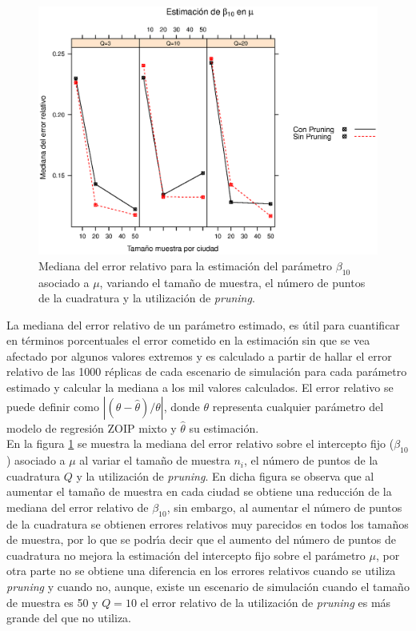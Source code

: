 \begin{figure}
	\begin{center}
		\includegraphics[scale=0.6]{MAPE_beta0_mu.eps}	
		\caption{Mediana del error relativo para la estimaci\'{o}n del par\'{a}metro $\beta_{10}$ asociado a $\mu$, variando el tama\~{n}o de muestra, el n\'{u}mero de puntos de la cuadratura y  la utilizaci\'{o}n de \textit{pruning}.}
		\label{MAPE_bo_mu}
	\end{center}
\end{figure}

La mediana del error relativo de un par\'{a}metro estimado, es \'{u}til para cuantificar en t\'{e}rminos porcentuales el error cometido en la estimaci\'{o}n sin que se vea afectado por algunos valores extremos y es calculado a partir de hallar el error relativo de las 1000 r\'{e}plicas de cada escenario de simulaci\'{o}n para cada par\'{a}metro estimado y calcular la mediana a los mil valores calculados. El error relativo se puede definir como $|(\theta-\hat{\theta})/\theta|$, donde $\theta$ representa cualquier par\'{a}metro del modelo de regresi\'{o}n ZOIP mixto y $\hat{\theta}$ su estimaci\'{o}n.\\

En la figura \ref{MAPE_bo_mu} se muestra la mediana del error relativo sobre el intercepto fijo ($\beta_{10}$) asociado a $\mu$ al variar el tama\~{n}o de muestra $n_i$, el n\'{u}mero de puntos de la cuadratura $Q$ y la utilizaci\'{o}n de \textit{pruning}. En dicha figura se observa que al aumentar el tama\~{n}o de muestra en cada ciudad se obtiene una reducci\'{o}n de la mediana del error relativo de $\beta_{10}$, sin embargo, al aumentar el n\'{u}mero de puntos de la cuadratura se obtienen errores relativos muy parecidos en todos los tama\~{n}os de muestra, por lo que se podr\'{\i}a decir que el aumento del n\'{u}mero de puntos de cuadratura no mejora la estimaci\'{o}n del intercepto fijo sobre el par\'{a}metro $\mu$, por otra parte no se obtiene una diferencia en los errores relativos cuando se utiliza \textit{pruning} y cuando no, aunque, existe un escenario de simulaci\'{o}n cuando el tama\~{n}o de muestra es 50 y $Q=10$ el error relativo de la utilizaci\'{o}n de \textit{pruning} es m\'{a}s grande del que no utiliza.\\



